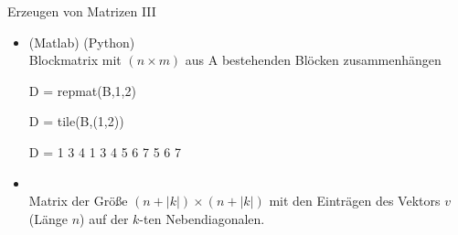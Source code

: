 \documentclass[hyperref={xetex}]{beamer}
\begin{document}
%
%
\begin{frame}[fragile]{Erzeugen von Matrizen III}
\begin{itemize}
\item {}(Matlab) (Python)\\ Blockmatrix mit $(n \times m)$
  aus A bestehenden Blöcken zusammenhängen
\begin{matlabin}
D = repmat(B,1,2) 
\end{matlabin}
\begin{pyin}
D = tile(B,(1,2))
\end{pyin}
\begin{matlab}
D =
     1     3     4     1     3     4
     5     6     7     5     6     7 
\end{matlab}


\item {} \\Matrix der Größe $(n+|k|) \times
  (n+|k|)$ mit den Einträgen des Vektors $v$ (Länge $n$) auf der $k$-ten Nebendiagonalen. 
\end{itemize}
\end{frame}
\end{document}
